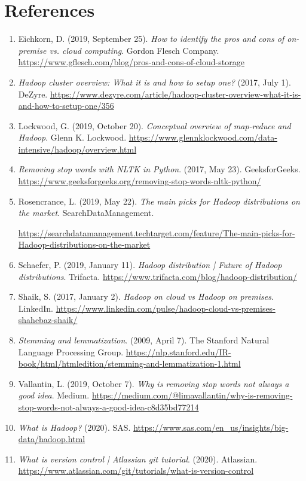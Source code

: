 \documentclass[]{article}
\begin{document}
\section{References}
\begin{enumerate}
	\item Eichkorn, D. (2019, September 25). \textit{How to identify the pros and cons of on-premise vs. cloud computing}. Gordon Flesch Company. \url{https://www.gflesch.com/blog/pros-and-cons-of-cloud-storage}
	
	\item \textit{Hadoop cluster overview: What it is and how to setup one?} (2017, July 1). DeZyre. \url{https://www.dezyre.com/article/hadoop-cluster-overview-what-it-is-and-how-to-setup-one/356}
	
	\item Lockwood, G. (2019, October 20). \textit{Conceptual overview of map-reduce and Hadoop}. Glenn K. Lockwood. \url{https://www.glennklockwood.com/data-intensive/hadoop/overview.html}
	
	\item \textit{Removing stop words with NLTK in Python}. (2017, May 23). GeeksforGeeks. \url{https://www.geeksforgeeks.org/removing-stop-words-nltk-python/}
	
	\item Rosencrance, L. (2019, May 22). \textit{The main picks for Hadoop distributions on the market}. SearchDataManagement. 
	
	\url{https://searchdatamanagement.techtarget.com/feature/The-main-picks-for-}\\
		\url{Hadoop-distributions-on-the-market}

	\item Schaefer, P. (2019, January 11). \textit{Hadoop distribution | Future of Hadoop distributions}. Trifacta. \url{https://www.trifacta.com/blog/hadoop-distribution/}

	\item Shaik, S. (2017, January 2). \textit{Hadoop on cloud vs Hadoop on premises}. LinkedIn. \url{https://www.linkedin.com/pulse/hadoop-cloud-vs-premises-shahebaz-shaik/}
	
	\item \textit{Stemming and lemmatization}. (2009, April 7). The Stanford Natural Language Processing Group. \url{https://nlp.stanford.edu/IR-book/html/htmledition/stemming-and-lemmatization-1.html}
	
	\item Vallantin, L. (2019, October 7). \textit{Why is removing stop words not always a good idea}. Medium. 
	\url{https://medium.com/@limavallantin/why-is-removing-stop-words-not-always-a-good-idea-c8d35bd77214}
	
	\item \textit{What is Hadoop?} (2020). SAS. \url{https://www.sas.com/en_us/insights/big-data/hadoop.html}
	
	\item \textit{What is version control | Atlassian git tutorial}. (2020). Atlassian. \url{https://www.atlassian.com/git/tutorials/what-is-version-control}
\end{enumerate}
\end{document}
